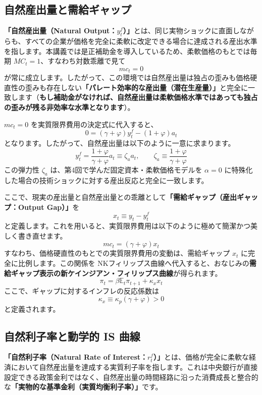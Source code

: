 \documentclass[
  japanese,
  lualatex,
  ja=standard,
  12pt,
  a4paper]{ltjsarticle}
\begin{document}
\subsection{自然産出量と需給ギャップ}\label{ux81eaux7136ux7523ux51faux91cfux3068ux9700ux7d66ux30aeux30e3ux30c3ux30d7}

\textbf{「自然産出量（Natural
Output：\(y_t^f\)）」}とは、同じ実物ショックに直面しながらも、すべての企業が価格を完全に柔軟に改定できる場合に達成される産出水準を指します。本講義では是正補助金を導入しているため、柔軟価格のもとでは毎期
\(MC_t=1\)、すなわち対数乖離で見て \[
mc_t=0
\]
が常に成立します。したがって、この環境では自然産出量は独占の歪みも価格硬直性の歪みも存在しない\textbf{「パレート効率的な産出量（潜在生産量）」}と完全に一致します（\textbf{もし補助金がなければ、自然産出量は柔軟価格水準ではあっても独占の歪みが残る非効率な水準となります}）。

\(mc_t=0\) を実質限界費用の決定式に代入すると、 \[
0=
(\gamma+\varphi)y_t^f
-(1+\varphi)a_t
\] となります。したがって、自然産出量は以下のように一意に求まります。 \[
y_t^f=
\frac{1+\varphi}{\gamma+\varphi}
a_t
\equiv
\zeta_a a_t,
\qquad
\zeta_a\equiv
\frac{1+\varphi}{\gamma+\varphi}
\] この弾力性 \(\zeta_a\) は、第4回で学んだ固定資本・柔軟価格モデルを
\(\alpha=0\)
に特殊化した場合の技術ショックに対する産出反応と完全に一致します。

ここで、現実の産出量と自然産出量との乖離として\textbf{「需給ギャップ（産出ギャップ：Output
Gap）」}を \[
x_t\equiv y_t-y_t^f
\]
と定義します。これを用いると、実質限界費用は以下のように極めて簡潔かつ美しく書き直せます。
\[
mc_t=
(\gamma+\varphi)x_t
\] すなわち、価格硬直性のもとでの実質限界費用の変動は、需給ギャップ
\(x_t\) に完全に比例します。この関係を
NKフィリップス曲線へ代入すると、おなじみの\textbf{需給ギャップ表示の新ケインジアン・フィリップス曲線}が得られます。
\[
\pi_t=\beta\mathbb{E}_t\pi_{t+1}+\kappa_x x_t
\] ここで、ギャップに対するインフレの反応係数は \[
\kappa_x\equiv
\kappa_p(\gamma+\varphi)>0
\] と定義されます。

\subsection{自然利子率と動学的 IS
曲線}\label{ux81eaux7136ux5229ux5b50ux7387ux3068ux52d5ux5b66ux7684-is-ux66f2ux7dda}

\textbf{「自然利子率（Natural Rate of
Interest：\(r_t^f\)）」}とは、価格が完全に柔軟な経済において自然産出量を達成する実質利子率を指します。これは中央銀行が直接設定できる政策金利ではなく、自然産出量の時間経路に沿った消費成長と整合的な\textbf{「実物的な基準金利（実質均衡利子率）」}です。
\end{document}

